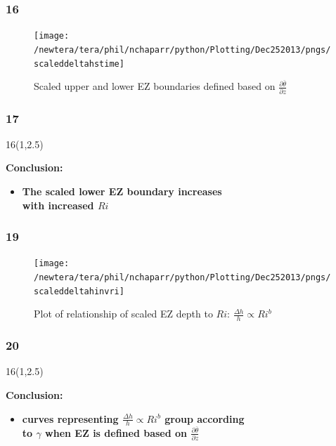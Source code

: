 \documentclass{beamer}
\newcommand\FrameText[1]{
\begin{textblock}{16}(1,2.5)
\raggedright #1
\end{textblock}}
\begin{document}
\begin{frame}
\frametitle{16}
\fontsize{12pt}{7.2}\selectfont
\begin{figure}
\centering
\texttt{[image: /newtera/tera/phil/nchaparr/python/Plotting/Dec252013/pngs/scaleddeltahstime]}
\caption{Scaled upper and lower EZ boundaries defined based on $\frac{\partial \overline{\theta}}{\partial z}$}
\end{figure}

\end{frame}

\begin{frame}
\frametitle{17}
\FrameText{\bf{\Large Conclusion:}
\vspace{5mm}
\begin{itemize}
\item \bf{\Large The scaled lower EZ boundary increases \\
with increased $Ri$}
\end{itemize}
}
\end{frame}


\begin{frame}
\fontsize{12pt}{7.2}\selectfont
\frametitle{19}
\begin{figure}
\centering
\texttt{[image: /newtera/tera/phil/nchaparr/python/Plotting/Dec252013/pngs/scaleddeltahinvri]}
\caption{Plot of relationship of scaled EZ depth to $Ri$: $\frac{\Delta h}{h} \propto Ri ^{b}$}
\end{figure}
\end{frame}

\begin{frame}
\frametitle{20}
\FrameText{\bf{\Large Conclusion}:
\vspace{5mm}
\begin{itemize}
\item \bf{\Large curves representing  $\frac{\Delta h}{h} \propto Ri ^{b}$ group according\\

to $\gamma$ when EZ is defined based on $\frac{\partial \overline{\theta}}{\partial z}$}
\end{itemize}
}
\end{frame}
\end{document}
